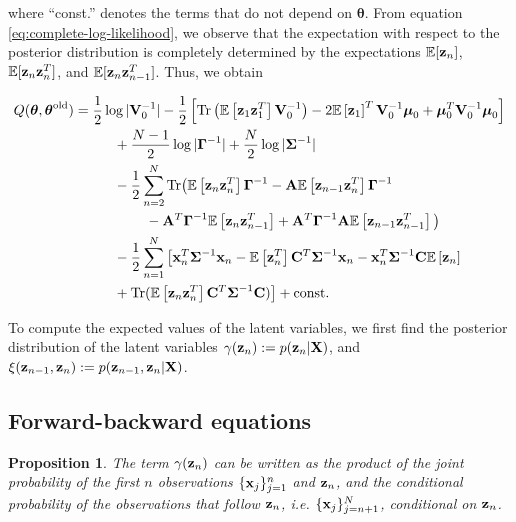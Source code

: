 \documentclass[12pt, oneside]{book}
\numberwithin{equation}{section}
\newcommand{\expectation}[1]{\mathbb{E}\left[#1\right]}
\newcommand{\x}{{\bf x}}
\newcommand{\z}{{\bf z}}
\newtheorem{proposition}{Proposition}[section]
\begin{document}
{where ``const.'' denotes the terms that do not depend on $\boldsymbol{\theta}$. From equation \eqref{eq:complete-log-likelihood}, we observe that the expectation with respect to the posterior distribution is completely determined by the expectations $\mathbb{E}[\z_n]$, $\mathbb{E}[\z_n\z_{n}^{T}]$, and  $\mathbb{E}[\z_n\z_{n-1}^{T}]$. Thus, we obtain

\begin{align}
	Q(\boldsymbol\theta, \boldsymbol\theta^\text{old}) &= \frac{1}{2}\log \vert
	  {\bf V}_0^{-1}\vert -\frac{1}{2}\left[\text{Tr}\left(\mathbb{E}\left[\z_1 \z_1^T\right] {\bf V}_0^{-1}\right) -2 \mathbb{E}\left[\z_1\right]^T{\bf V}_0^{-1}\boldsymbol\mu_0 + \boldsymbol\mu_0^T {\bf V}_0^{-1}\boldsymbol\mu_0\right] \nonumber \\
	  &\hspace{1cm}+ \frac{N-1}{2}\log\vert\boldsymbol\Gamma^{-1}\vert + \frac{N}{2}\log\vert \boldsymbol\Sigma^{-1}\vert \nonumber \\
	  &\hspace{1cm}-\frac{1}{2} \sum_{n=2}^{N}\text{Tr}\big(\expectation{\z_n\z_n^T}\boldsymbol\Gamma^{-1} - {\bf A}\expectation{\z_{n-1}\z_n^T}\boldsymbol\Gamma^{-1} \nonumber\\
	  &\hspace{1.8cm} - {\bf A}^T\boldsymbol{\Gamma}^{-1}\expectation{\z_n\z_{n-1}^T} + {\bf A}^T\boldsymbol\Gamma^{-1}{\bf A}\expectation{\z_{n-1}\z_{n-1}^T}\big) \nonumber\\
	  &\hspace{1cm}-\frac{1}{2}\sum_{n=1}^N\big[\x_n^T\boldsymbol{\Sigma}^{-1}\x_n-\expectation{\z_n^T}{\bf C}^T \boldsymbol\Sigma^{-1}\x_n - \x_n^T\boldsymbol\Sigma^{-1}{\bf C}\expectation{\z_n} \nonumber\\
	  &\hspace{1cm} + \text{Tr}(\mathbb{E}\left[\z_n\z_n^T\right]{\bf C}^T\boldsymbol\Sigma^{-1}{\bf C})\big] + \text{const.}  \label{eq:Q-LDS}
\end{align}


To compute the expected values of the latent variables, we first find the posterior distribution of the latent variables $\gamma(\z_n) := p(\z_n\vert {\bf X})$, and $\xi(\z_{n-1}, \z_{n}) := p(\z_{n-1}, \z_n\vert {\bf X})$.

\subsection{Forward-backward equations}
\begin{proposition}\label{prop:gamma-factorisation}
	The term $\gamma(\z_n)$ can be written as the product of the joint probability of the first $n$ observations $\{\x_j\}_{j=1}^n$ and $\z_n$, and the conditional probability of the observations that follow $\z_n$, i.e. $\{\x_j\}_{j=n+1}^{N}$, conditional on $\z_n$.
\end{proposition}

}
\end{document}
